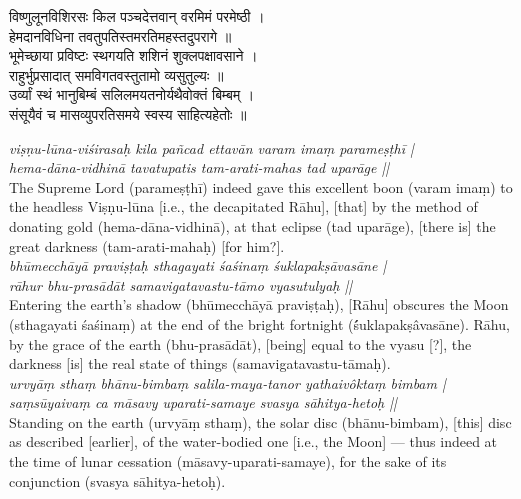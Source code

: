 \documentclass[11pt,a4paper]{article}
\newcommand{\dev}[1]{{\devanagarifont #1}}
\newcommand{\bilingualpair}[2]{%
  \noindent%
  \begin{minipage}[t]{0.48\textwidth}
    #1%
  \end{minipage}%
  \hfill%
  \begin{minipage}[t]{0.48\textwidth}
    #2%
  \end{minipage}%
  \par\vspace{0.5em}%
}
\newenvironment{sanskritcol}{\devanagarifont\small}{}
\newenvironment{englishcol}{\iastfont\small}{}
\begin{document}
\vspace{0.3cm}
\bilingualpair{%
\begin{sanskritcol}
\dev{विष्णुलूनविशिरसः किल पञ्चदेत्तवान् वरमिमं परमेष्ठी ।}\\[0.3em]
\dev{हेमदानविधिना तवतुपतिस्तमरतिमहस्तदुपरागे ॥}\\[0.5em]
\dev{भूमेच्छाया प्रविष्टः स्थगयति शशिनं शुक्लपक्षावसाने ।}\\[0.3em]
\dev{राहुर्भुप्रसादात् समविगतवस्तुतामो व्यसुतुल्यः ॥}\\[0.5em]
\dev{उर्व्यां स्थं भानुबिम्बं सलिलमयतनोर्यथैवोक्तं बिम्बम् ।}\\[0.3em]
\dev{संसूयैवं च मासव्युपरतिसमये स्वस्य साहित्यहेतोः ॥}
\end{sanskritcol}%
}{%
\begin{englishcol}
\textit{viṣṇu-lūna-viśirasaḥ kila pañcad ettavān varam imaṃ parameṣṭhī |}\\[0.3em]
\textit{hema-dāna-vidhinā tavatupatis tam-arati-mahas tad uparāge ||}\\[0.3em]
The Supreme Lord (parameṣṭhī) indeed gave this excellent boon (varam imaṃ) to the headless Viṣṇu-lūna [i.e., the decapitated Rāhu], [that] by the method of donating gold (hema-dāna-vidhinā), at that eclipse (tad uparāge), [there is] the great darkness (tam-arati-mahaḥ) [for him?].\\[0.5em]
\textit{bhūmecchāyā praviṣṭaḥ sthagayati śaśinaṃ śuklapakṣāvasāne |}\\[0.3em]
\textit{rāhur bhu-prasādāt samavigatavastu-tāmo vyasutulyaḥ ||}\\[0.3em]
Entering the earth's shadow (bhūmecchāyā praviṣṭaḥ), [Rāhu] obscures the Moon (sthagayati śaśinaṃ) at the end of the bright fortnight (\'śuklapakṣâvasāne). Rāhu, by the grace of the earth (bhu-prasādāt), [being] equal to the vyasu [?], the darkness [is] the real state of things (samavigatavastu-tāmaḥ).\\[0.5em]
\textit{urvyāṃ sthaṃ bhānu-bimbaṃ salila-maya-tanor yathaivôktaṃ bimbam |}\\[0.3em]
\textit{saṃsūyaivaṃ ca māsavy uparati-samaye svasya sāhitya-hetoḥ ||}\\[0.3em]
Standing on the earth (urvyāṃ sthaṃ), the solar disc (bhānu-bimbam), [this] disc as described [earlier], of the water-\-bodied one [i.e., the Moon] --- thus indeed at the time of lunar cessation (māsavy-uparati-samaye), for the sake of its conjunction (svasya sāhitya-hetoḥ).
\end{englishcol}%
}
\end{document}
